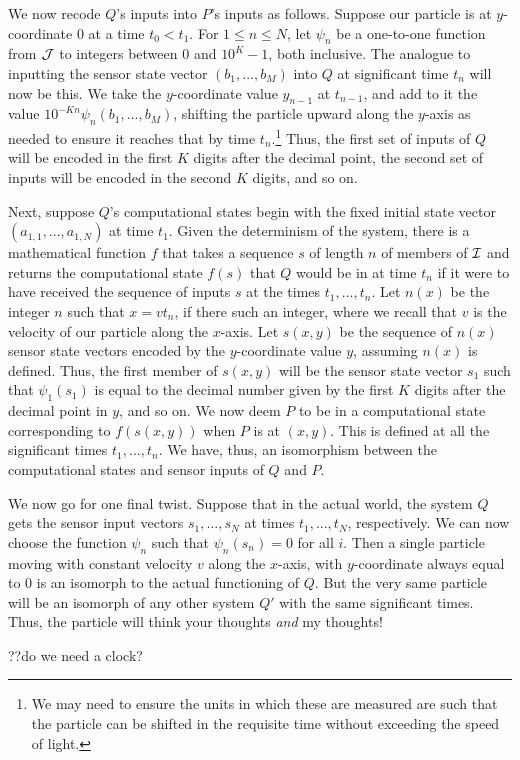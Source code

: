 We now recode $Q$'s inputs into $P$'s inputs as follows. Suppose our particle is at $y$-coordinate $0$ at a time $t_0<t_1$. 
For $1\le n\le N$, let $\psi_n$ be a one-to-one function from $\mathcal J$ to integers between $0$ and $10^K-1$, both inclusive. The analogue 
to inputting the sensor state vector $(b_1,...,b_M)$ into $Q$ at significant time $t_n$ will now be this. We take
the $y$-coordinate value $y_{n-1}$ at $t_{n-1}$, and add to it the value $10^{-Kn} \psi_n(b_1,...,b_M)$, shifting the particle
upward along the $y$-axis as needed to ensure it reaches that by time $t_n$.\footnote{We may need to ensure the units in which
these are measured are such that the particle can be shifted in the requisite time without exceeding the speed of light.} Thus, 
the first set of inputs of $Q$ will be encoded in the first $K$ digits after the decimal point, the second set of inputs
will be encoded in the second $K$ digits, and so on.

Next, suppose $Q$'s computational states begin with the fixed initial state vector $(a_{1,1},...,a_{1,N})$ at time $t_1$. Given 
the determinism of the system, there is a mathematical function $f$ that takes a sequence $s$ of length $n$ of members of $\mathcal I$ 
and returns the computational state $f(s)$ that $Q$ would be in at time $t_n$ if it were to have received the sequence of inputs $s$ 
at the times $t_1,...,t_n$. Let $n(x)$ be the integer $n$ such that $x=v t_n$, if there such an integer, where we recall that
$v$ is the velocity of our particle along the $x$-axis. Let $s(x,y)$ be the sequence of $n(x)$ sensor state vectors encoded 
by the $y$-coordinate value $y$, assuming $n(x)$ is defined. Thus, the first member of $s(x,y)$ will be the sensor state vector
$s_1$ such that $\psi_1(s_1)$ is equal to the decimal number given by the first $K$ digits after the decimal point in $y$, and so on.
We now deem $P$ to be in a computational state corresponding to $f(s(x,y))$ when $P$ is at $(x,y)$. This is defined at all the
significant times $t_1,...,t_n$. We have, thus, an isomorphism between the computational states and sensor inputs of $Q$ and $P$.

We now go for one final twist. Suppose that in the actual world, the
system $Q$ gets the sensor input vectors $s_1,...,s_N$ at times $t_1,...,t_N$, respectively. We can now choose the 
function $\psi_n$ such that $\psi_n(s_n)=0$ for all $i$. Then a single particle moving with constant velocity 
$v$ along the $x$-axis, with $y$-coordinate always equal to $0$ is an isomorph to the actual functioning of $Q$.
But the very same particle will be an isomorph of any other system $Q'$ with the same significant times. Thus,
the particle will think your thoughts \textit{and} my thoughts!

??do we need a clock?

\chaptertail 


